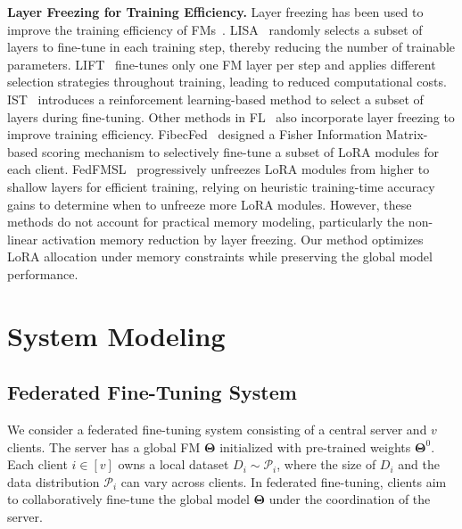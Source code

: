 \documentclass[sigconf]{acmart}
\begin{document}
\textbf{Layer Freezing for Training Efficiency.} 
{
Layer freezing has been used to improve the training efficiency of FMs}~\cite{pan2024lisa,zhu2023lift,yao2024layer}.
LISA~\cite{pan2024lisa} randomly selects a subset of layers to fine-tune in each training step, thereby reducing the number of trainable parameters. LIFT~\cite{zhu2023lift} fine-tunes only one FM layer per step and applies different selection strategies throughout training, leading to reduced computational costs. IST~\cite{yao2024layer} introduces a reinforcement learning-based method to select a subset of layers during fine-tuning. Other methods in FL~\cite{liu2024fisher,wu2024fedfmsl} also incorporate layer freezing to improve training efficiency. 
FibecFed~\cite{liu2024fisher} designed a Fisher Information Matrix-based scoring mechanism to selectively fine-tune a subset of LoRA modules for each client.
FedFMSL~\cite{wu2024fedfmsl} progressively unfreezes LoRA modules from higher to shallow layers for efficient training, relying on heuristic training-time accuracy gains to determine when to unfreeze more LoRA modules.
However, these methods do not account for practical memory modeling, particularly the non-linear activation memory reduction by layer freezing. Our method optimizes LoRA allocation under memory constraints while preserving the global model performance.


\section{System Modeling}\label{sec:sys_model}


\subsection{Federated Fine-Tuning System}\label{sec:leaning_model}
We consider a federated fine-tuning system consisting of a central server and $v$ clients. The server has a global FM $\boldsymbol{\Theta}$ initialized with pre-trained weights $\boldsymbol{\Theta}^0$. Each client $i\in[v]$ owns a local dataset $D_i\sim\mathcal{P}_i$, where the size of $D_i$ and the data distribution $\mathcal{P}_i$ can vary across clients. In federated fine-tuning, clients aim to collaboratively fine-tune the global model $\boldsymbol{\Theta}$ under the coordination of the server.
\end{document}
